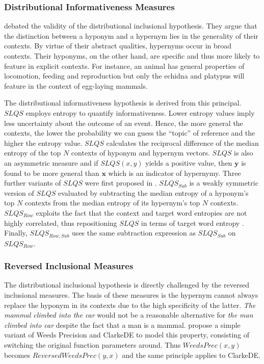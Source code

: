 \subsubsection{Distributional Informativeness Measures}
\citeauthor{santus2014chasing} debated the validity of the distributional inclusional hypothesis.  They argue that the distinction between a hyponym and a hypernym lies in the generality of their contexts.  By virtue of their abstract qualities, hypernyms occur in broad contexts.  Their hyponyms, on the other hand, are specific and thus more likely to feature in explicit contexts.  For instance, an animal has general properties of locomotion, feeding and reproduction but only the echidna and platypus will feature in the context of egg-laying mammals.

The distributional informativeness hypothesis is derived from this principal.  $SLQS$ \citep{santus2014chasing} employs entropy to quantify informativeness.  Lower entropy values imply less uncertainty about the outcome of an event.  Hence, the more general the contexts, the lower the probability we can guess the “topic” of reference and the higher the entropy value.  $SLQS$ calculates the reciprocal difference of the median entropy of the top $N$ contexts of hyponym and hypernym vectors.  $SLQS$ is also an asymmetric measure and if $SLQS(x, y)$ yields a positive value, then $\textbf{y}$ is found to be more general than $\textbf{x}$ which is an indicator of hypernymy.  Three further variants of $SLQS$ were first proposed in \citep{shwartz2017siege}.  $SLQS_{Sub}$ is a weakly symmetric version of $SLQS$ evaluated by subtracting the median entropy of a hyponym's top $N$ contexts from the median entropy of its hypernym's top $N$ contexts.  $SLQS_{Row}$ exploits the fact that the context and target word entropies are not highly correlated, thus repositioning $SLQS$ in terms of target word entropy \citep{shwartz2017siege}.  Finally, $SLQS_{Row, Sub}$ uses the same subtraction expression as $SLQS_{Sub}$ on $SLQS_{Row}$.

\subsubsection{Reversed Inclusional Measures}
The distributional inclusional hypothesis is directly challenged by the reversed inclusional measures.  The basis of these measures is the hypernym cannot always replace the hyponym in its contexts due to the high specificity of the latter.  \textit{The mammal climbed into the car} would not be a reasonable alternative for \textit{the man climbed into car} despite the fact that a man is a mammal.  \citep{shwartz2017siege} propose a simple variant of Weeds Precision and ClarkeDE to model this property, consisting of switching the original function parameters around.  Thus $WeedsPrec(x,y)$ becomes $ReversedWeedsPrec(y, x)$ and the same principle applies to ClarkeDE.

